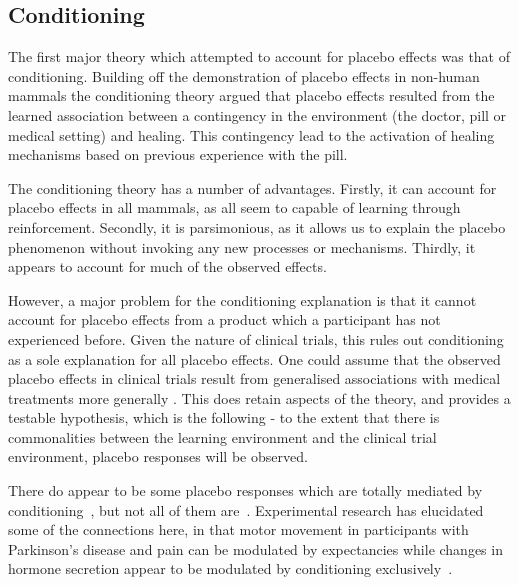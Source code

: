 \subsection{Conditioning}
\label{sec:conditioning}

The first major theory which attempted to account for placebo effects was that of conditioning. Building off the demonstration of placebo effects in non-human mammals \cite{Herrnstein1962} the conditioning theory argued that placebo effects resulted from the learned association between a contingency in the environment (the doctor, pill or medical setting) and healing. This contingency lead to the activation of healing mechanisms based on previous experience with the pill. 

The conditioning theory has a number of advantages. Firstly, it can account for placebo effects in all mammals, as all seem to capable of learning through reinforcement. Secondly, it is parsimonious, as it allows us to explain the placebo phenomenon without invoking any new processes or mechanisms. Thirdly, it appears to account for much of the observed effects. 

However, a major problem for the conditioning explanation is that it cannot account for placebo effects from a product which a participant  has not experienced before. Given the nature of clinical trials, this rules out   conditioning as a sole explanation for all placebo effects.  One could assume that the observed placebo effects in clinical trials result from generalised associations with medical treatments more generally \cite{pearce1987model}. This does retain aspects of the theory, and provides a testable hypothesis, which is the following - to the extent that there is commonalities between the learning environment and the clinical trial environment, placebo responses will be observed.  


There do appear to be some placebo responses which are totally mediated by conditioning~\cite{Amanzio1999}, but not all of them are~\cite{benedetti2003a}. Experimental research has elucidated some of the connections here, in that motor movement in participants with Parkinson's disease and pain can be modulated by expectancies while changes in hormone secretion appear to be modulated by conditioning exclusively~\cite{benedetti2003a}.

